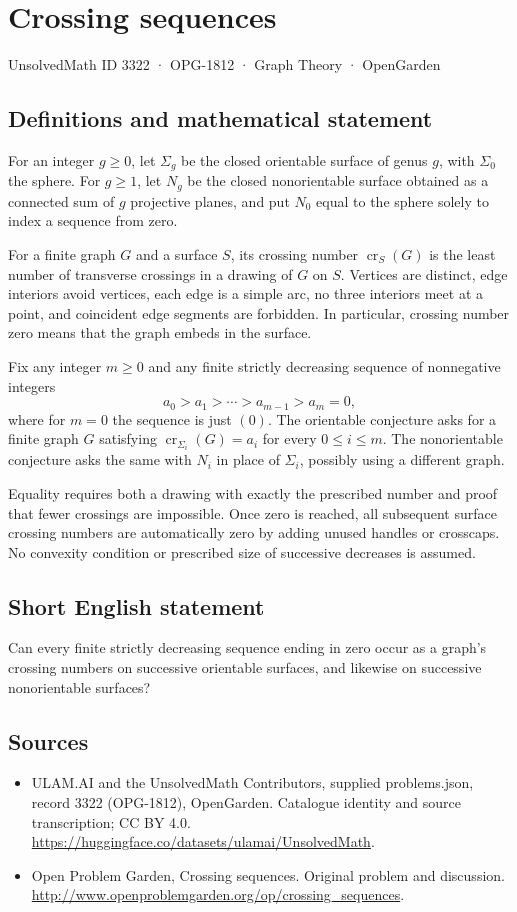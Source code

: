 \documentclass[11pt,a4paper]{article}
\begin{document}
\section*{Crossing sequences}\label{3322}
{\small UnsolvedMath ID 3322 · OPG-1812 · Graph Theory · OpenGarden}
\subsection{Definitions and mathematical statement}
For an integer $g\ge0$, let $\Sigma_g$ be the closed orientable surface of genus $g$, with $\Sigma_0$ the sphere. For $g\ge1$, let $N_g$ be the closed nonorientable surface obtained as a connected sum of $g$ projective planes, and put $N_0$ equal to the sphere solely to index a sequence from zero.

For a finite graph $G$ and a surface $S$, its crossing number $\operatorname{cr}_S(G)$ is the least number of transverse crossings in a drawing of $G$ on $S$. Vertices are distinct, edge interiors avoid vertices, each edge is a simple arc, no three interiors meet at a point, and coincident edge segments are forbidden. In particular, crossing number zero means that the graph embeds in the surface.

Fix any integer $m\ge0$ and any finite strictly decreasing sequence of nonnegative integers
\[
                    a_0>a_1>\cdots>a_{m-1}>a_m=0,
\]
where for $m=0$ the sequence is just $(0)$. The orientable conjecture asks for a finite graph $G$ satisfying $\operatorname{cr}_{\Sigma_i}(G)=a_i$ for every $0\le i\le m$. The nonorientable conjecture asks the same with $N_i$ in place of $\Sigma_i$, possibly using a different graph.

Equality requires both a drawing with exactly the prescribed number and proof that fewer crossings are impossible. Once zero is reached, all subsequent surface crossing numbers are automatically zero by adding unused handles or crosscaps. No convexity condition or prescribed size of successive decreases is assumed.
\subsection{Short English statement}
Can every finite strictly decreasing sequence ending in zero occur as a graph’s crossing numbers on successive orientable surfaces, and likewise on successive nonorientable surfaces?
\subsection{Sources}
\begin{itemize}
\item[S1] ULAM.AI and the UnsolvedMath Contributors, supplied problems.json, record 3322 (OPG-1812), OpenGarden. Catalogue identity and source transcription; CC BY 4.0.
\url{https://huggingface.co/datasets/ulamai/UnsolvedMath}.
\item[S2] Open Problem Garden, Crossing sequences. Original problem and discussion.
\url{http://www.openproblemgarden.org/op/crossing_sequences}.
\end{itemize}
\end{document}
